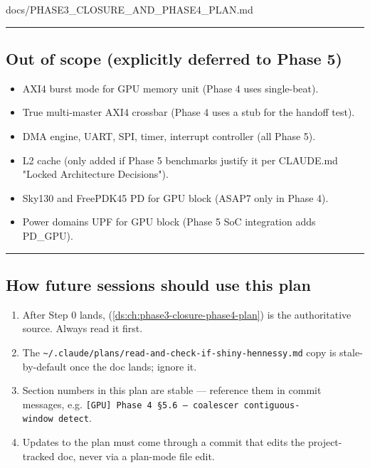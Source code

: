 \begin{relocated}{docs/PHASE3_CLOSURE_AND_PHASE4_PLAN.md}
\begin{center}\rule{0.5\linewidth}{0.5pt}\end{center}

\subsection{Out of scope (explicitly deferred to Phase 5)}\label{ds:ch:phase3-closure-phase4-plan:11-out-of-scope-explicitly-deferred-to-phase-5}

\begin{itemize}
\tightlist
\item
  AXI4 burst mode for GPU memory unit (Phase 4 uses single-beat).
\item
  True multi-master AXI4 crossbar (Phase 4 uses a stub for the handoff
  test).
\item
  DMA engine, UART, SPI, timer, interrupt controller (all Phase 5).
\item
  L2 cache (only added if Phase 5 benchmarks justify it per CLAUDE.md
  "Locked Architecture Decisions").
\item
  Sky130 and FreePDK45 PD for GPU block (ASAP7 only in Phase 4).
\item
  Power domains UPF for GPU block (Phase 5 SoC integration adds
  PD\_GPU).
\end{itemize}

\begin{center}\rule{0.5\linewidth}{0.5pt}\end{center}

\subsection{How future sessions should use this plan}\label{ds:ch:phase3-closure-phase4-plan:12-how-future-sessions-should-use-this-plan}

\begin{enumerate}
\def\labelenumi{\arabic{enumi}.}
\tightlist
\item
  After Step 0 lands,  (\cref{ds:ch:phase3-closure-phase4-plan}) is
  the authoritative source. Always read it first.
\item
  The
  \texttt{\textasciitilde{}/\allowbreak{}.\allowbreak{}claude/\allowbreak{}plans/\allowbreak{}read-\allowbreak{}and-\allowbreak{}check-\allowbreak{}if-\allowbreak{}shiny-\allowbreak{}hennessy.\allowbreak{}md}
  copy is stale-by-default once the doc lands; ignore it.
\item
  Section numbers in this plan are stable --- reference them in commit
  messages, e.g.
  \texttt{[GPU]\ Phase\ 4\ §5.\allowbreak{}6\ —\ coalescer\ contiguous-\allowbreak{}window\ detect}.
\item
  Updates to the plan must come through a \code{[Doc]} commit that edits
  the project-tracked doc, never via a plan-mode file edit.
\end{enumerate}
\end{relocated}

